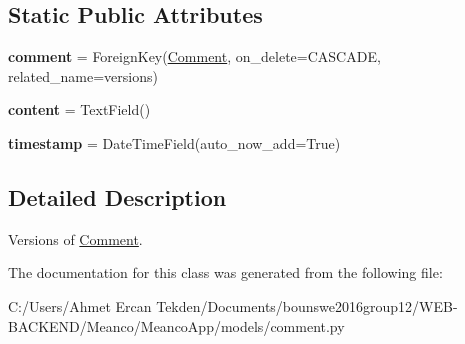 \subsection*{Static Public Attributes}
\begin{DoxyCompactItemize}
\item 
\hypertarget{class_meanco_app_1_1models_1_1comment_1_1_version_a147066ad18f5a196837c8ebb369a7cef}{}\label{class_meanco_app_1_1models_1_1comment_1_1_version_a147066ad18f5a196837c8ebb369a7cef} 
{\bfseries comment} = Foreign\+Key(\hyperlink{class_meanco_app_1_1models_1_1comment_1_1_comment}{Comment}, on\+\_\+delete=C\+A\+S\+C\+A\+DE, related\+\_\+name=\textquotesingle{}versions\textquotesingle{})
\item 
\hypertarget{class_meanco_app_1_1models_1_1comment_1_1_version_adc8fd4549fa1c69c638350afa9bc115c}{}\label{class_meanco_app_1_1models_1_1comment_1_1_version_adc8fd4549fa1c69c638350afa9bc115c} 
{\bfseries content} = Text\+Field()
\item 
\hypertarget{class_meanco_app_1_1models_1_1comment_1_1_version_a029cd2f9378cca8ed13751dfb420e6fd}{}\label{class_meanco_app_1_1models_1_1comment_1_1_version_a029cd2f9378cca8ed13751dfb420e6fd} 
{\bfseries timestamp} = Date\+Time\+Field(auto\+\_\+now\+\_\+add=True)
\end{DoxyCompactItemize}


\subsection{Detailed Description}
Versions of \hyperlink{class_meanco_app_1_1models_1_1comment_1_1_comment}{Comment}. 

The documentation for this class was generated from the following file\+:\begin{DoxyCompactItemize}
\item 
C\+:/\+Users/\+Ahmet Ercan Tekden/\+Documents/bounswe2016group12/\+W\+E\+B-\/\+B\+A\+C\+K\+E\+N\+D/\+Meanco/\+Meanco\+App/models/comment.\+py\end{DoxyCompactItemize}
